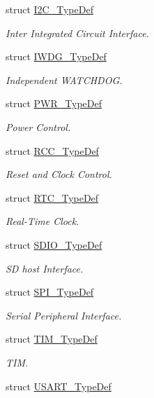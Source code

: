 \begin{DoxyCompactItemize}
struct \hyperlink{struct_i2_c___type_def}{I2\-C\-\_\-\-Type\-Def}
\begin{DoxyCompactList}\small\item\em Inter Integrated Circuit Interface. \end{DoxyCompactList}\item 
struct \hyperlink{struct_i_w_d_g___type_def}{I\-W\-D\-G\-\_\-\-Type\-Def}
\begin{DoxyCompactList}\small\item\em Independent W\-A\-T\-C\-H\-D\-O\-G. \end{DoxyCompactList}\item 
struct \hyperlink{struct_p_w_r___type_def}{P\-W\-R\-\_\-\-Type\-Def}
\begin{DoxyCompactList}\small\item\em Power Control. \end{DoxyCompactList}\item 
struct \hyperlink{struct_r_c_c___type_def}{R\-C\-C\-\_\-\-Type\-Def}
\begin{DoxyCompactList}\small\item\em Reset and Clock Control. \end{DoxyCompactList}\item 
struct \hyperlink{struct_r_t_c___type_def}{R\-T\-C\-\_\-\-Type\-Def}
\begin{DoxyCompactList}\small\item\em Real-\/\-Time Clock. \end{DoxyCompactList}\item 
struct \hyperlink{struct_s_d_i_o___type_def}{S\-D\-I\-O\-\_\-\-Type\-Def}
\begin{DoxyCompactList}\small\item\em S\-D host Interface. \end{DoxyCompactList}\item 
struct \hyperlink{struct_s_p_i___type_def}{S\-P\-I\-\_\-\-Type\-Def}
\begin{DoxyCompactList}\small\item\em Serial Peripheral Interface. \end{DoxyCompactList}\item 
struct \hyperlink{struct_t_i_m___type_def}{T\-I\-M\-\_\-\-Type\-Def}
\begin{DoxyCompactList}\small\item\em T\-I\-M. \end{DoxyCompactList}\item 
struct \hyperlink{struct_u_s_a_r_t___type_def}{U\-S\-A\-R\-T\-\_\-\-Type\-Def}

\end{DoxyCompactItemize}
